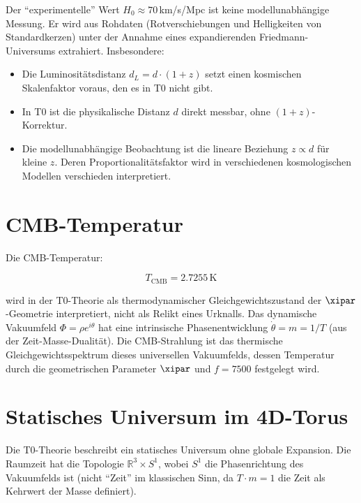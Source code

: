 \begin{remark}
	Der ``experimentelle'' Wert $H_0 \approx 70\,$km/s/Mpc ist keine 
	modellunabhängige Messung. Er wird aus Rohdaten (Rotverschiebungen und 
	Helligkeiten von Standardkerzen) unter der Annahme eines expandierenden 
	Friedmann-Universums extrahiert. Insbesondere:
	\begin{itemize}
	\item Die Luminositätsdistanz $d_L = d \cdot (1+z)$ setzt einen 
	kosmischen Skalenfaktor voraus, den es in T0 nicht gibt.
	\item In T0 ist die physikalische Distanz $d$ direkt messbar, ohne 
	$(1+z)$-Korrektur.
	\item Die modellunabhängige Beobachtung ist die lineare Beziehung 
	$z \propto d$ für kleine $z$. Deren Proportionalitätsfaktor wird 
	in verschiedenen kosmologischen Modellen verschieden interpretiert.
	\end{itemize}
\end{remark}

\section{CMB-Temperatur}

Die CMB-Temperatur:

\begin{equation}
T_{\text{CMB}} = 2.7255\,\text{K}
\end{equation}

wird in der T0-Theorie als thermodynamischer Gleichgewichtszustand der 
$\xipar$-Geometrie interpretiert, nicht als Relikt eines Urknalls. Das 
dynamische Vakuumfeld $\Phi = \rho e^{i\theta}$ hat eine intrinsische 
Phasenentwicklung $\dot{\theta} = m = 1/T$ (aus der Zeit-Masse-Dualität). 
Die CMB-Strahlung ist das thermische Gleichgewichtsspektrum dieses 
universellen Vakuumfelds, dessen Temperatur durch die geometrischen 
Parameter $\xipar$ und $f = 7500$ festgelegt wird.

\section{Statisches Universum im 4D-Torus}

Die T0-Theorie beschreibt ein statisches Universum ohne globale Expansion. 
Die Raumzeit hat die Topologie $\mathbb{R}^3 \times S^1$, wobei $S^1$ die 
Phasenrichtung des Vakuumfelds ist (nicht ``Zeit'' im klassischen Sinn, 
da $T \cdot m = 1$ die Zeit als Kehrwert der Masse definiert).

